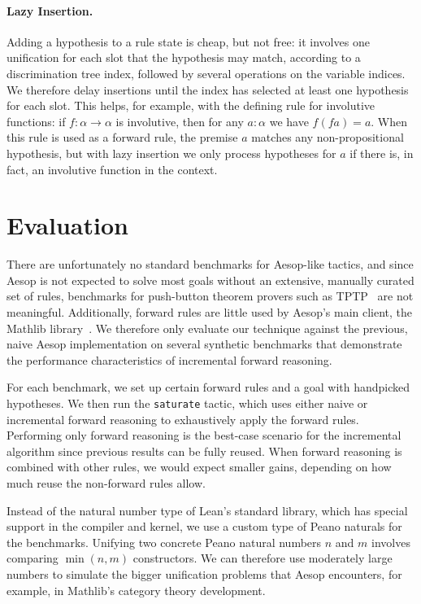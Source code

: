 \documentclass[runningheads,leqno]{llncs}
\newcommand{\para}[1]{\paragraph{\bfseries\upshape #1}}
\begin{document}
\para{Lazy Insertion.}
Adding a hypothesis to a rule state is cheap, but not free: it involves one unification for each slot that the hypothesis may match, according to a discrimination tree index, followed by several operations on the variable indices.
We therefore delay insertions until the index has selected at least one hypothesis for each slot.
This helps, for example, with the defining rule for involutive functions: if $f : α → α$ is involutive, then for any $a : α$ we have $f (f a) = a$.
When this rule is used as a forward rule, the premise $a$ matches any non-propositional hypothesis, but with lazy insertion we only process hypotheses for $a$ if there is, in fact, an involutive function in the context.

\section{Evaluation}%
\label{sec:evaluation}

There are unfortunately no standard benchmarks for Aesop-like tactics, and since Aesop is not expected to solve most goals without an extensive, manually curated set of rules, benchmarks for push-button theorem provers such as TPTP~\cite{TPTP} are not meaningful.
Additionally, forward rules are little used by Aesop's main client, the Mathlib library~\cite{Mathlib}.
We therefore only evaluate our technique against the previous, naive Aesop implementation on several synthetic benchmarks that demonstrate the performance characteristics of incremental forward reasoning.

For each benchmark, we set up certain forward rules and a goal with handpicked hypotheses.
We then run the \texttt{saturate} tactic, which uses either naive or incremental forward reasoning to exhaustively apply the forward rules.
Performing only forward reasoning is the best-case scenario for the incremental algorithm since previous results can be fully reused.
When forward reasoning is combined with other rules, we would expect smaller gains, depending on how much reuse the non-forward rules allow.

Instead of the natural number type of Lean's standard library, which has special support in the compiler and kernel, we use a custom type of Peano naturals for the benchmarks.
Unifying two concrete Peano natural numbers $n$ and $m$ involves comparing $\min(n, m)$ constructors.
We can therefore use moderately large numbers to simulate the bigger unification problems that Aesop encounters, for example, in Mathlib's category theory development.
\end{document}
